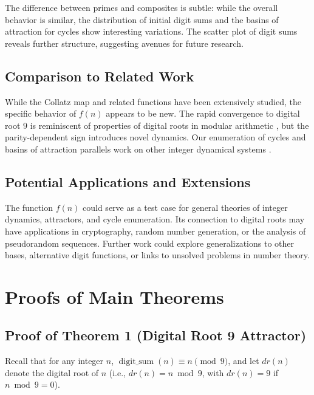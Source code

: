 \documentclass[12pt]{article}
\begin{document}
The difference between primes and composites is subtle: while the overall behavior is similar, the distribution of initial digit sums and the basins of attraction for cycles show interesting variations. The scatter plot of digit sums reveals further structure, suggesting avenues for future research.

\subsection{Comparison to Related Work}
While the Collatz map and related functions have been extensively studied, the specific behavior of $f(n)$ appears to be new. The rapid convergence to digital root $9$ is reminiscent of properties of digital roots in modular arithmetic \cite{guy2004unsolved, allouche2003automatic}, but the parity-dependent sign introduces novel dynamics. Our enumeration of cycles and basins of attraction parallels work on other integer dynamical systems \cite{lagarias2010collatz, wirsching1998dynamical}.

\subsection{Potential Applications and Extensions}
The function $f(n)$ could serve as a test case for general theories of integer dynamics, attractors, and cycle enumeration. Its connection to digital roots may have applications in cryptography, random number generation, or the analysis of pseudorandom sequences. Further work could explore generalizations to other bases, alternative digit functions, or links to unsolved problems in number theory.

\section{Proofs of Main Theorems}
\label{sec:proofs}
\subsection{Proof of Theorem 1 (Digital Root 9 Attractor)}
Recall that for any integer $n$, $\operatorname{digit\_sum}(n) \equiv n \pmod{9}$, and let $dr(n)$ denote the digital root of $n$ (i.e., $dr(n) = n \bmod 9$, with $dr(n) = 9$ if $n \bmod 9 = 0$).
\end{document}
